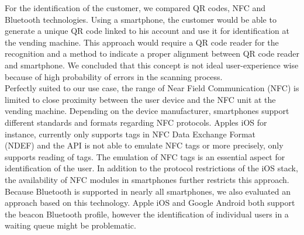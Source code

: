 For the identification of the customer, we compared QR codes, NFC and Bluetooth technologies. Using a smartphone, the customer would be able to generate a unique QR code linked to his account and use it for identification at the vending machine. This approach would require a QR code reader for the recognition and a method to indicate a proper alignment between QR code reader and smartphone. We concluded that this concept is not ideal user-experience wise because of high probability of errors in the scanning process. \\
Perfectly suited to our use case, the range of Near Field Communication (NFC) is limited to close proximity between the user device and the NFC unit at the vending machine. Depending on the device manufacturer, smartphones support different standards and formats regarding NFC protocols. Apples iOS for instance, currently only supports tags in NFC Data Exchange Format \\ (NDEF) \cite{apple-nfc:online} and the API is not able to emulate NFC tags or more precisely, only supports reading of tags. The emulation of NFC tags is an essential aspect for identification of the user. In addition to the protocol restrictions of the iOS stack, the availability of NFC modules in smartphones further restricts this approach.\\
Because Bluetooth is supported in nearly all smartphones, we also evaluated an approach based on this technology. Apple iOS and Google Android both support the beacon Bluetooth profile, however the identification of individual users in a waiting queue might be problematic.

